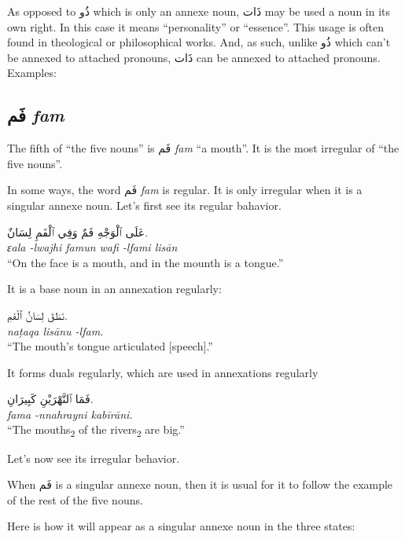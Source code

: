 \documentclass[
  10pt,
]{book}
\begin{document}
As opposed to \foreignlanguage{arabic}{ذُو} which is only an annexe noun, \foreignlanguage{arabic}{ذَات} may be used a noun in its own right. In this case it means \enquote{personality} or \enquote{essence}. This usage is often found in theological or philosophical works. And, as such, unlike \foreignlanguage{arabic}{ذُو} which can't be annexed to attached pronouns, \foreignlanguage{arabic}{ذَات} can be annexed to attached pronouns. Examples:

\subsection{\texorpdfstring{\foreignlanguage{arabic}{فَم} \emph{fam}}{فَم fam}}\label{ux641ux645-fam}

The fifth of \enquote{the five nouns} is \foreignlanguage{arabic}{فَم} \emph{fam} \enquote{a mouth}. It is the most irregular of \enquote{the five nouns}.

In some ways, the word \foreignlanguage{arabic}{فَم} \emph{fam} is regular. It is only irregular when it is a singular annexe noun. Let's first see its regular bahavior.

\foreignlanguage{arabic}{عَلَى ٱلْوَجْهِ فَمٌ وَفِي ٱلْفَمِ لِسَانٌ.}\\
\emph{ɛala -lwajhi famun wafi -lfami lisān}\\
\enquote{On the face is a mouth, and in the mounth is a tongue.}

It is a base noun in an annexation regularly:

\foreignlanguage{arabic}{نَطَقَ لِسَانُ ٱلْفَمِ.}\\
\emph{naṭaqa lisānu -lfam.}\\
\enquote{The mouth's tongue articulated {[}speech{]}.}

It forms duals regularly, which are used in annexations regularly

\foreignlanguage{arabic}{فَمَا ٱلنَّهْرَيْنِ کَبِيرَانِ.}\\
\emph{fama -nnahrayni kabīrāni.}\\
\enquote{The mouths\textsubscript{2} of the rivers\textsubscript{2} are big.}

Let's now see its irregular behavior.

When \foreignlanguage{arabic}{فَم} is a singular annexe noun, then it is usual for it to follow the example of the rest of the five nouns.

Here is how it will appear as a singular annexe noun in the three states:
\end{document}
